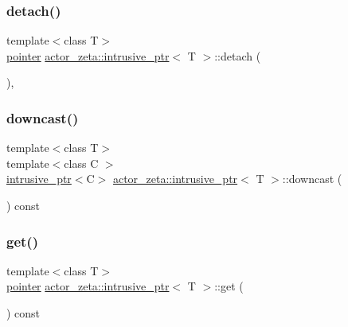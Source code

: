 \subsubsection{\texorpdfstring{detach()}{detach()}}
{\footnotesize\ttfamily template$<$class T$>$ \\
\hyperlink{classactor__zeta_1_1intrusive__ptr_a149a1cdd3f154db67d7f53a371bfc4e4}{pointer} \hyperlink{classactor__zeta_1_1intrusive__ptr}{actor\+\_\+zeta\+::intrusive\+\_\+ptr}$<$ T $>$\+::detach (\begin{DoxyParamCaption}{ }\end{DoxyParamCaption})\hspace{0.3cm}{\ttfamily [inline]}, {\ttfamily [noexcept]}}

\mbox{\label{classactor__zeta_1_1intrusive__ptr_a5a252da64a663dc6b8832c3355057e6e}} 
\subsubsection{\texorpdfstring{downcast()}{downcast()}}
{\footnotesize\ttfamily template$<$class T$>$ \\
template$<$class C $>$ \\
\hyperlink{classactor__zeta_1_1intrusive__ptr}{intrusive\+\_\+ptr}$<$C$>$ \hyperlink{classactor__zeta_1_1intrusive__ptr}{actor\+\_\+zeta\+::intrusive\+\_\+ptr}$<$ T $>$\+::downcast (\begin{DoxyParamCaption}{ }\end{DoxyParamCaption}) const\hspace{0.3cm}{\ttfamily [inline]}}

\mbox{\label{classactor__zeta_1_1intrusive__ptr_ae393577a76eb877c94967b27654fe3cd}} 
\subsubsection{\texorpdfstring{get()}{get()}}
{\footnotesize\ttfamily template$<$class T$>$ \\
\hyperlink{classactor__zeta_1_1intrusive__ptr_a149a1cdd3f154db67d7f53a371bfc4e4}{pointer} \hyperlink{classactor__zeta_1_1intrusive__ptr}{actor\+\_\+zeta\+::intrusive\+\_\+ptr}$<$ T $>$\+::get (\begin{DoxyParamCaption}{ }\end{DoxyParamCaption}) const\hspace{0.3cm}{\ttfamily [inline]}}

